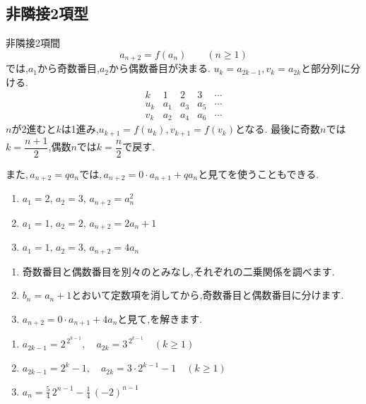 \subsection{非隣接2項型}\label{節：非隣接2項間漸化式型}

  非隣接2項間
  \[
    a_{n+2}=f(a_n)\qquad(n\ge1)
  \]
  では,$a_1$から奇数番目,$a_2$から偶数番目が決まる.
  $u_k=a_{2k-1},v_k=a_{2k}$と部分列に分ける.
  \[
    \begin{array}{c|cccc}
      k&1&2&3&\cdots\\ \hline
      u_k&a_1&a_3&a_5&\cdots\\
      v_k&a_2&a_4&a_6&\cdots
    \end{array}
  \]
  $n$が2進むと$k$は1進み,$u_{k+1}=f(u_k),v_{k+1}=f(v_k)$となる.
  最後に奇数$n$では$k=\dfrac{n+1}{2}$,偶数$n$では$k=\dfrac{n}{2}$で戻す.

  また,\,$a_{n+2}=qa_n$では,\,$a_{n+2}=0\cdot a_{n+1}+qa_n$と見てを使うこともできる.

  \noindent {}\par\nobreak
  \begin{enumerate}[label=(\arabic*),parsep=3pt,format=\bookitemlink{example-nonadjacent-1}{problem}{answer}]
    \item $\displaystyle a_1=2,\,a_2=3,\,a_{n+2}=a_n^2$
    \item $\displaystyle a_1=1,\,a_2=2,\,a_{n+2}=2a_n+1$
    \item $\displaystyle a_1=1,\,a_2=3,\,a_{n+2}=4a_n$
  \end{enumerate}

  \noindent{}\par\nobreak
  \begin{enumerate}[label=(\arabic*),parsep=3pt,format=\bookitemlink{example-nonadjacent-1}{hint}{problem}]
    \item 奇数番目と偶数番目を別々のとみなし,それぞれの二乗関係を調べます.
    \item $b_n=a_n+1$とおいて定数項を消してから,奇数番目と偶数番目に分けます.
    \item $a_{n+2}=0\cdot a_{n+1}+4a_n$と見て,を解きます.
  \end{enumerate}

  \noindent{}\par\nobreak
  \begin{enumerate}[label=(\arabic*),parsep=3pt,format=\bookitemlink{example-nonadjacent-1}{answer}{problem}]
    \item $\displaystyle a_{2k-1}=2^{\,2^{k-1}},\quad a_{2k}=3^{\,2^{k-1}}\quad(k\ge1)$
    \item $\displaystyle a_{2k-1}=2^k-1,\quad a_{2k}=3\cdot2^{k-1}-1\quad(k\ge1)$
    \item $\displaystyle a_n=\frac54\,2^{n-1}-\frac14\,(-2)^{n-1}$
  \end{enumerate}


